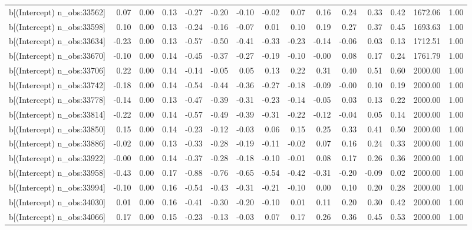 \begin{table}[ht]
\begin{tabular}{rrrrrrrrrrrrrrr}
  b[(Intercept) n\_obs:33562] & 0.07 & 0.00 & 0.13 & -0.27 & -0.20 & -0.10 & -0.02 & 0.07 & 0.16 & 0.24 & 0.33 & 0.42 & 1672.06 & 1.00 \\ 
  b[(Intercept) n\_obs:33598] & 0.10 & 0.00 & 0.13 & -0.24 & -0.16 & -0.07 & 0.01 & 0.10 & 0.19 & 0.27 & 0.37 & 0.45 & 1693.63 & 1.00 \\ 
  b[(Intercept) n\_obs:33634] & -0.23 & 0.00 & 0.13 & -0.57 & -0.50 & -0.41 & -0.33 & -0.23 & -0.14 & -0.06 & 0.03 & 0.13 & 1712.51 & 1.00 \\ 
  b[(Intercept) n\_obs:33670] & -0.10 & 0.00 & 0.14 & -0.45 & -0.37 & -0.27 & -0.19 & -0.10 & -0.00 & 0.08 & 0.17 & 0.24 & 1761.79 & 1.00 \\ 
  b[(Intercept) n\_obs:33706] & 0.22 & 0.00 & 0.14 & -0.14 & -0.05 & 0.05 & 0.13 & 0.22 & 0.31 & 0.40 & 0.51 & 0.60 & 2000.00 & 1.00 \\ 
  b[(Intercept) n\_obs:33742] & -0.18 & 0.00 & 0.14 & -0.54 & -0.44 & -0.36 & -0.27 & -0.18 & -0.09 & -0.00 & 0.10 & 0.19 & 2000.00 & 1.00 \\ 
  b[(Intercept) n\_obs:33778] & -0.14 & 0.00 & 0.13 & -0.47 & -0.39 & -0.31 & -0.23 & -0.14 & -0.05 & 0.03 & 0.13 & 0.22 & 2000.00 & 1.00 \\ 
  b[(Intercept) n\_obs:33814] & -0.22 & 0.00 & 0.14 & -0.57 & -0.49 & -0.39 & -0.31 & -0.22 & -0.12 & -0.04 & 0.05 & 0.14 & 2000.00 & 1.00 \\ 
  b[(Intercept) n\_obs:33850] & 0.15 & 0.00 & 0.14 & -0.23 & -0.12 & -0.03 & 0.06 & 0.15 & 0.25 & 0.33 & 0.41 & 0.50 & 2000.00 & 1.00 \\ 
  b[(Intercept) n\_obs:33886] & -0.02 & 0.00 & 0.13 & -0.33 & -0.28 & -0.19 & -0.11 & -0.02 & 0.07 & 0.16 & 0.24 & 0.33 & 2000.00 & 1.00 \\ 
  b[(Intercept) n\_obs:33922] & -0.00 & 0.00 & 0.14 & -0.37 & -0.28 & -0.18 & -0.10 & -0.01 & 0.08 & 0.17 & 0.26 & 0.36 & 2000.00 & 1.00 \\ 
  b[(Intercept) n\_obs:33958] & -0.43 & 0.00 & 0.17 & -0.88 & -0.76 & -0.65 & -0.54 & -0.42 & -0.31 & -0.20 & -0.09 & 0.02 & 2000.00 & 1.00 \\ 
  b[(Intercept) n\_obs:33994] & -0.10 & 0.00 & 0.16 & -0.54 & -0.43 & -0.31 & -0.21 & -0.10 & 0.00 & 0.10 & 0.20 & 0.28 & 2000.00 & 1.00 \\ 
  b[(Intercept) n\_obs:34030] & 0.01 & 0.00 & 0.16 & -0.41 & -0.30 & -0.20 & -0.10 & 0.01 & 0.11 & 0.20 & 0.30 & 0.42 & 2000.00 & 1.00 \\ 
  b[(Intercept) n\_obs:34066] & 0.17 & 0.00 & 0.15 & -0.23 & -0.13 & -0.03 & 0.07 & 0.17 & 0.26 & 0.36 & 0.45 & 0.53 & 2000.00 & 1.00 \\ 

\end{tabular}
\end{table}
